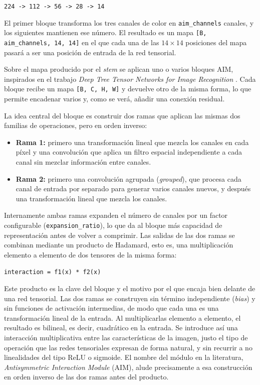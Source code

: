 \begin{center}
\texttt{224 -> 112 -> 56 -> 28 -> 14}
\end{center}

El primer bloque transforma los tres canales de color en \texttt{aim\_channels} canales, y los siguientes mantienen ese número. El resultado es un mapa \texttt{[B, aim\_channels, 14, 14]} en el que cada una de las $14\times14$ posiciones del mapa pasará a ser una posición de entrada de la red tensorial.

Sobre el mapa producido por el \textit{stem} se aplican uno o varios bloques AIM, inspirados en el trabajo \textit{Deep Tree Tensor Networks for Image Recognition} . Cada bloque recibe un mapa \texttt{[B, C, H, W]} y devuelve otro de la misma forma, lo que permite encadenar varios y, como se verá, añadir una conexión residual.

La idea central del bloque es construir dos ramas que aplican las mismas dos familias de operaciones, pero en orden inverso:

\begin{itemize}
    \item \textbf{Rama 1:} primero una transformación lineal que mezcla los canales en cada píxel y una convolución que aplica un filtro espacial independiente a cada canal sin mezclar información entre canales.
    \item \textbf{Rama 2:} primero una convolución agrupada (\textit{grouped}), que procesa cada canal de entrada por separado para generar varios canales nuevos, y después una transformación lineal que mezcla los canales.
\end{itemize}

Internamente ambas ramas expanden el número de canales por un factor configurable (\texttt{expansion\_ratio}), lo que da al bloque más capacidad de representación antes de volver a comprimir. Las salidas de las dos ramas se combinan mediante un producto de Hadamard, esto es, una multiplicación elemento a elemento de dos tensores de la misma forma:

\begin{center}
\texttt{interaction = f1(x) * f2(x)}
\end{center}

Este producto es la clave del bloque y el motivo por el que encaja bien delante de una red tensorial. Las dos ramas se construyen sin término independiente (\textit{bias}) y sin funciones de activación intermedias, de modo que cada una es una transformación lineal de la entrada. Al multiplicarlas elemento a elemento, el resultado es bilineal, es decir, cuadrático en la entrada. Se introduce así una interacción multiplicativa entre las características de la imagen, justo el tipo de operación que las redes tensoriales expresan de forma natural, y sin recurrir a no linealidades del tipo ReLU o sigmoide. El nombre del módulo en la literatura, \textit{Antisymmetric Interaction Module} (AIM), alude precisamente a esa construcción en orden inverso de las dos ramas antes del producto.

